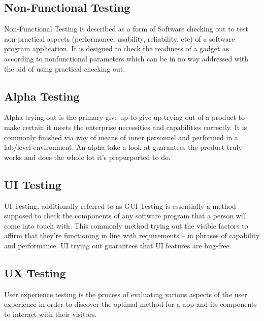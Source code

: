 \subsection{Non-Functional Testing}
Non-Functional Testing is described as a form of Software checking out to test non-practical aspects (performance, usability, reliability, etc) of a software program application. It is designed to check the readiness of a gadget as according to nonfunctional parameters which can be in no way addressed with the aid of using practical checking out.
\subsection{Alpha Testing}
Alpha trying out is the primary give up-to-give up trying out of a product to make certain it meets the enterprise necessities and capabilities correctly. It is commonly finished via way of means of inner personnel and performed in a lab/level environment. An alpha take a look at guarantees the product truly works and does the whole lot it’s prepurported to do.
\subsection{UI Testing}
UI Testing, additionally referred to as GUI Testing is essentially a method supposed to check the components of any software program that a person will come into touch with. This commonly method trying out the visible factors to affirm that they're functioning in line with requirements – in phrases of capability and performance. UI trying out guarantees that UI features are bug-free.
\subsection{UX Testing}
User experience testing is the process of evaluating various aspects of the user experience in order to discover the optimal method for a app and its components to interact with their visitors.
